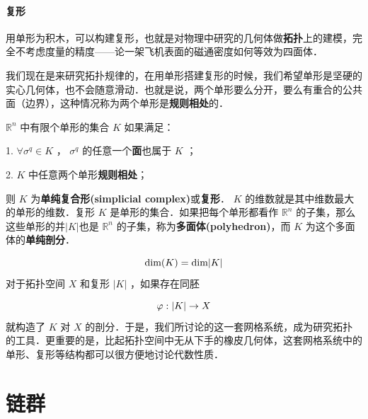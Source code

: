         \paragraph{复形}
            用单形为积木，可以构建复形，也就是对物理中研究的几何体做\textbf{拓扑}上的建模，完全不考虑度量的精度——论一架飞机表面的磁通密度如何等效为四面体．\par
            我们现在是来研究拓扑规律的，在用单形搭建复形的时候，我们希望单形是坚硬的实心几何体，也不会随意滑动．也就是说，两个单形要么分开，要么有重合的公共面（边界），这种情况称为两个单形是\textbf{规则相处}的．\par
            $\mathbb{R}^n$ 中有限个单形的集合 $K$ 如果满足：\par
            1. $\forall \sigma^q \in K$ ， $\sigma^q$ 的任意一个\textbf{面}也属于 $K$ ；\par
            2. $K$ 中任意两个单形\textbf{规则相处}；\par
            则 $K$ 为\textbf{单纯复合形(simplicial complex)}或\textbf{复形}． $K$ 的维数就是其中维数最大的单形的维数．复形 $K$ 是单形的集合．如果把每个单形都看作 $\mathbb{R}^n$ 的子集，那么这些单形的并$\vert K \vert$也是 $\mathbb{R}^n$ 的子集，称为\textbf{多面体(polyhedron)}，而 $K$ 为这个多面体的\textbf{单纯剖分}．\par
            $$
                \text{dim}(K) = \text{dim}\vert K \vert \\
            $$
            对于拓扑空间 $X$ 和复形 $\vert K \vert$ ，如果存在同胚\par
            $$
                \varphi:\vert K \vert \to X \\
            $$
            就构造了 $K$ 对 $X$ 的剖分．于是，我们所讨论的这一套网格系统，成为研究拓扑的工具．更重要的是，比起拓扑空间中无从下手的橡皮几何体，这套网格系统中的单形、复形等结构都可以很方便地讨论代数性质．\par

    \section{链群}

